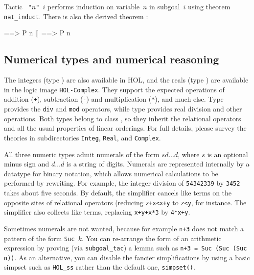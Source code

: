 Tactic {\tt{} "$n$" $i$} performs induction on variable~$n$
in subgoal~$i$ using theorem \texttt{nat_induct}.  There is also the derived
theorem :
\begin{ttbox}
[| !!n. [| ! m. m<n --> P m |] ==> P n |]  ==>  P n
\end{ttbox}


\subsection{Numerical types and numerical reasoning}

The integers (type ) are also available in HOL, and the reals (type
) are available in the logic image \texttt{HOL-Complex}.  They support
the expected operations of addition (\texttt{+}), subtraction (\texttt{-}) and
multiplication (\texttt{*}), and much else.  Type  provides the
\texttt{div} and \texttt{mod} operators, while type  provides real
division and other operations.  Both types belong to class , so
they inherit the relational operators and all the usual properties of linear
orderings.  For full details, please survey the theories in subdirectories
\texttt{Integ}, \texttt{Real}, and \texttt{Complex}.

All three numeric types admit numerals of the form \texttt{$sd\ldots d$},
where $s$ is an optional minus sign and $d\ldots d$ is a string of digits.
Numerals are represented internally by a datatype for binary notation, which
allows numerical calculations to be performed by rewriting.  For example, the
integer division of \texttt{54342339} by \texttt{3452} takes about five
seconds.  By default, the simplifier cancels like terms on the opposite sites
of relational operators (reducing \texttt{z+x<x+y} to \texttt{z<y}, for
instance.  The simplifier also collects like terms, replacing \texttt{x+y+x*3}
by \texttt{4*x+y}.

Sometimes numerals are not wanted, because for example \texttt{n+3} does not
match a pattern of the form \texttt{Suc $k$}.  You can re-arrange the form of
an arithmetic expression by proving (via \texttt{subgoal_tac}) a lemma such as
\texttt{n+3 = Suc (Suc (Suc n))}.  As an alternative, you can disable the
fancier simplifications by using a basic simpset such as \texttt{HOL_ss}
rather than the default one, \texttt{simpset()}.

